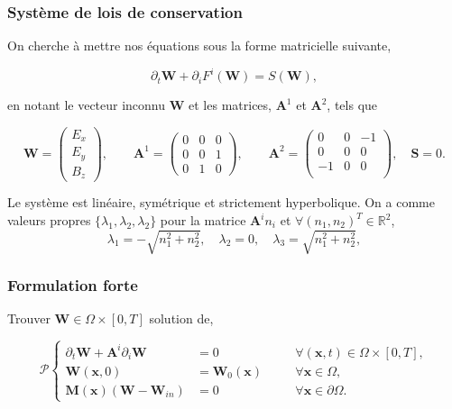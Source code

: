 \documentclass[9pt]{beamer}
\begin{document}
\begin{frame}
\frametitle{Système de lois de conservation}
On cherche à mettre nos équations sous la forme matricielle suivante,

\begin{equation}
\label{eq:sysh}
\partial_t \mathbf{W} +  \partial_i F^i(\mathbf{W}) = S(\mathbf{W}),
\end{equation}

en notant le vecteur inconnu $\mathbf{W}$ et les matrices, $\mathbf{A}^1$ et $\mathbf{A}^2$, tels que

\begin{equation}
\mathbf{W}=
\begin{pmatrix}
E_x\\
E_y\\
B_z
\end{pmatrix},
\qquad
\mathbf{A}^1=
\begin{pmatrix}
0 & 0 & 0\\
0 & 0 & 1\\
0 & 1 & 0
\end{pmatrix},
\qquad
\mathbf{A}^2=
\begin{pmatrix}
0 & 0 & -1\\
0 & 0 & 0\\
-1 & 0 & 0\\
\end{pmatrix},
\quad \mathbf{S} = 0.
\end{equation}

Le système est linéaire, symétrique et strictement hyperbolique. On a comme valeurs propres $\{\lambda_1,\lambda_2,\lambda_2\}$ pour la matrice $\mathbf{A}^i n_i$ et $\forall (n_1,n_2 )^T \in \mathbb{R}^2$,
\begin{equation}
\label{eq:vp}
\lambda_1 = -\sqrt{n_1^2 + n_2^2},\quad \lambda_2 =0,\quad \lambda_3 = \sqrt{n_1^2 + n_2^2},
\end{equation}

\end{frame}




\begin{frame}
\frametitle{Formulation forte}
Trouver  $\mathbf{W}\in\Omega \times [0,T]$ solution de,

\begin{equation}
\label{eq:final}
\mathcal{P} \left\{
\begin{aligned}
\partial_t \mathbf{W} +  \mathbf{A}^i\partial_i \mathbf{W} &= 0 &\quad &\forall (\mathbf{x},t) \in \Omega \times [0,T],\\
\mathbf{W}(\mathbf{x},0)&=\mathbf{W}_0(\mathbf{x}) &\quad &\forall \mathbf{x} \in \Omega,\\
\mathbf{M}(\mathbf{x})(\mathbf{W}-\mathbf{W}_{in})&=0&\quad&\forall \mathbf{x} \in \partial\Omega.
\end{aligned}
\right.
\end{equation}

\end{frame}
\end{document}
